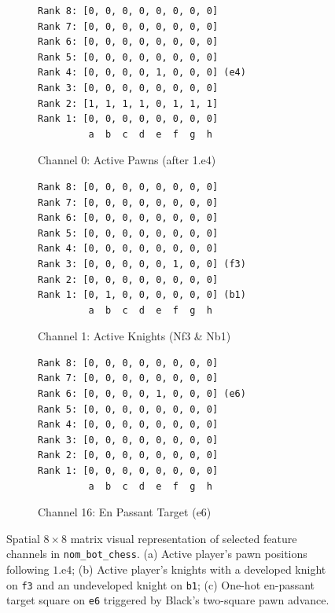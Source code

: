 \documentclass[10pt,journal,compsoc]{IEEEtran}
\begin{document}
\begin{figure}[!htbp]
\centering
\begin{subfigure}[b]{\linewidth}
\begin{lstlisting}[style=pythonstyle, numbers=none]
Rank 8: [0, 0, 0, 0, 0, 0, 0, 0]
Rank 7: [0, 0, 0, 0, 0, 0, 0, 0]
Rank 6: [0, 0, 0, 0, 0, 0, 0, 0]
Rank 5: [0, 0, 0, 0, 0, 0, 0, 0]
Rank 4: [0, 0, 0, 0, 1, 0, 0, 0] (e4)
Rank 3: [0, 0, 0, 0, 0, 0, 0, 0]
Rank 2: [1, 1, 1, 1, 0, 1, 1, 1]
Rank 1: [0, 0, 0, 0, 0, 0, 0, 0]
         a  b  c  d  e  f  g  h
\end{lstlisting}
\caption{Channel 0: Active Pawns (after 1.e4)}
\end{subfigure}

\vspace{2mm}
\begin{subfigure}[b]{\linewidth}
\begin{lstlisting}[style=pythonstyle, numbers=none]
Rank 8: [0, 0, 0, 0, 0, 0, 0, 0]
Rank 7: [0, 0, 0, 0, 0, 0, 0, 0]
Rank 6: [0, 0, 0, 0, 0, 0, 0, 0]
Rank 5: [0, 0, 0, 0, 0, 0, 0, 0]
Rank 4: [0, 0, 0, 0, 0, 0, 0, 0]
Rank 3: [0, 0, 0, 0, 0, 1, 0, 0] (f3)
Rank 2: [0, 0, 0, 0, 0, 0, 0, 0]
Rank 1: [0, 1, 0, 0, 0, 0, 0, 0] (b1)
         a  b  c  d  e  f  g  h
\end{lstlisting}
\caption{Channel 1: Active Knights (Nf3 \& Nb1)}
\end{subfigure}

\vspace{2mm}
\begin{subfigure}[b]{\linewidth}
\begin{lstlisting}[style=pythonstyle, numbers=none]
Rank 8: [0, 0, 0, 0, 0, 0, 0, 0]
Rank 7: [0, 0, 0, 0, 0, 0, 0, 0]
Rank 6: [0, 0, 0, 0, 1, 0, 0, 0] (e6)
Rank 5: [0, 0, 0, 0, 0, 0, 0, 0]
Rank 4: [0, 0, 0, 0, 0, 0, 0, 0]
Rank 3: [0, 0, 0, 0, 0, 0, 0, 0]
Rank 2: [0, 0, 0, 0, 0, 0, 0, 0]
Rank 1: [0, 0, 0, 0, 0, 0, 0, 0]
         a  b  c  d  e  f  g  h
\end{lstlisting}
\caption{Channel 16: En Passant Target (e6)}
\end{subfigure}
\caption{Spatial $8 \times 8$ matrix visual representation of selected feature channels in \texttt{nom\_bot\_chess}. (a) Active player's pawn positions following $1.\text{e4}$; (b) Active player's knights with a developed knight on \texttt{f3} and an undeveloped knight on \texttt{b1}; (c) One-hot en-passant target square on \texttt{e6} triggered by Black's two-square pawn advance.}
\label{fig:channel_matrices}
\end{figure}
\end{document}
